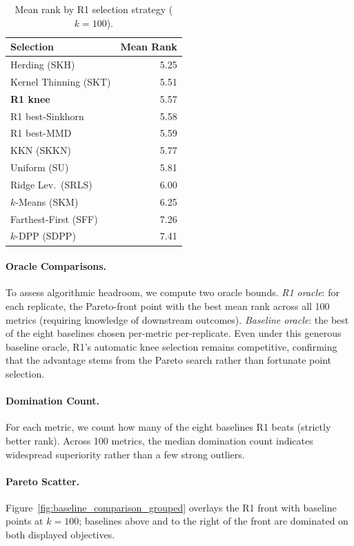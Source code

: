 \documentclass[10pt,journal]{IEEEtran}
\newcommand{\1}{\mathbf{1}}
\theoremstyle{ieeethm}
\begin{document}
\begin{table}[t]
\centering
\caption{Mean rank by R1 selection strategy ($k=100$).}
\label{tab:selection_strategies}
\small
\begin{tabular}{@{}l r@{}}
\toprule
Selection & Mean Rank \\
\midrule
Herding (SKH)            & 5.25 \\
Kernel Thinning (SKT)    & 5.51 \\
\textbf{R1 knee}         & 5.57 \\
R1 best-Sinkhorn         & 5.58 \\
R1 best-MMD              & 5.59 \\
KKN (SKKN)               & 5.77 \\
Uniform (SU)             & 5.81 \\
Ridge Lev.\ (SRLS)       & 6.00 \\
$k$-Means (SKM)          & 6.25 \\
Farthest-First (SFF)     & 7.26 \\
$k$-DPP (SDPP)           & 7.41 \\
\bottomrule
\end{tabular}
\end{table}

\paragraph{Oracle Comparisons.}
To assess algorithmic headroom, we compute two oracle bounds.
\emph{R1 oracle}: for each replicate, the Pareto-front point with the best mean rank across
all 100 metrics (requiring knowledge of downstream outcomes).
\emph{Baseline oracle}: the best of the eight baselines chosen per-metric per-replicate.
Even under this generous baseline oracle, R1's automatic knee selection remains competitive,
confirming that the advantage stems from the Pareto search rather than fortunate point
selection.

\paragraph{Domination Count.}
For each metric, we count how many of the eight baselines R1 beats (strictly better rank).
Across 100 metrics, the median domination count indicates widespread superiority rather than
a few strong outliers.

\paragraph{Pareto Scatter.}
Figure~\ref{fig:baseline_comparison_grouped} overlays the R1 front with baseline points at
$k=100$; baselines above and to the right of the front are dominated on both displayed
objectives.
\end{document}
